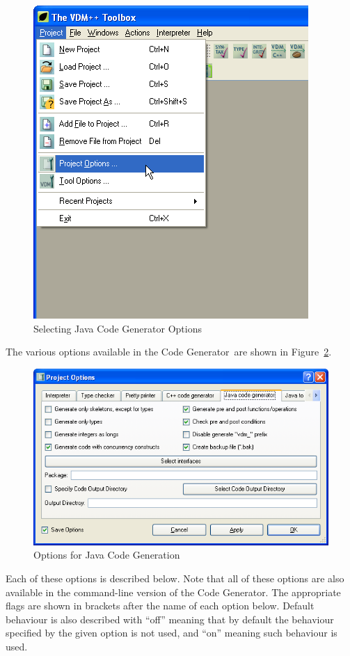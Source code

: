 \documentclass[\pformat,11pt]{article}
\newcommand{\tcg}{the Code Generator}
\begin{document}
\begin{figure}[H]
\begin{center}
\includegraphics[width=.8\textwidth]{optionsmenu}
\caption{Selecting Java Code Generator Options}\label{fig:optionsmenu}
\end{center}
\end{figure}

The various options available in \tcg\ are shown in
Figure~\ref{fig:options}. 
\begin{figure}
\begin{center}
\includegraphics[width=.8\textwidth]{options}
\caption{Options for Java Code Generation}\label{fig:options}
\end{center}
\end{figure}
Each of these options is described below. Note that all of these
options are also available in the command-line version of \tcg. The
appropriate flags are shown in brackets after the name of each option
below. Default behaviour is also described with ``off'' meaning that
by default the behaviour specified by the given option is not used,
and ``on'' meaning such behaviour is used.
\end{document}
